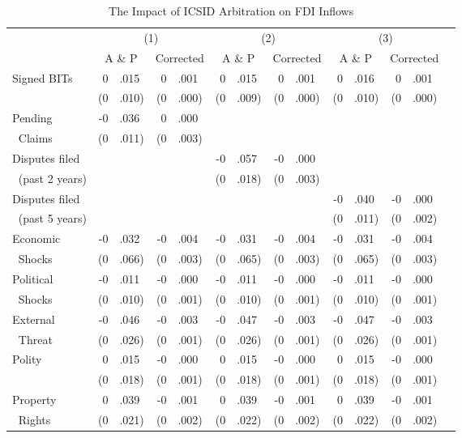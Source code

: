\documentclass[12pt,onesided]{amsart}
\begin{document}

\begin{table}[ht]
\vspace{1cm}
\centering
{\footnotesize
\caption{The Impact of ICSID Arbitration on FDI Inflows}
\label{tab:allee}
\begin{tabular}{lr@{} lr@{}lr@{}lr@{}lr@{}lr@{}lr@{} }
	\hline\hline
	~ & \multicolumn{4}{c}{(1)} & \multicolumn{4}{c}{(2)} & \multicolumn{4}{c}{(3)} \\	
	~ & \multicolumn{2}{c}{A \& P} & \multicolumn{2}{c}{Corrected} & \multicolumn{2}{c}{A \& P} & \multicolumn{2}{c}{Corrected} & \multicolumn{2}{c}{A \& P} & \multicolumn{2}{c}{Corrected}
	 \\ \hline
	\multirow{2}{*}{Signed BITs} & 0&.015 & 0&.001 & 0&.015 & 0&.001 & 0&.016 & 0&.001 \\
	~ & (0&.010) & (0&.000) & (0&.009) & (0&.000) & (0&.010) & (0&.000) \\
	Pending &-0&.036 &0&.000 && && && \\
	$\;\;$Claims &(0&.011) &(0&.003) && && && \\
	Disputes filed && && &-0&.057 &-0&.000 && && \\
	$\;\;$(past 2 years) && && &(0&.018) &(0&.003) && && \\
	Disputes filed && && && && &-0&.040 &-0&.000 \\
	$\;\;$(past 5 years) && && && && &(0&.011) &(0&.002) \\
	Economic & -0&.032 & -0&.004 & -0&.031 & -0&.004 & -0&.031 & -0&.004 \\
	$\;\;$Shocks & (0&.066) & (0&.003) & (0&.065) & (0&.003) & (0&.065) & (0&.003) \\
	Political & -0&.011 & -0&.000 & -0&.011 & -0&.000 & -0&.011 & -0&.000 \\
	$\;\;$Shocks & (0&.010) & (0&.001) & (0&.010) & (0&.001) & (0&.010) &(0&.001) \\
	External & -0&.046 & -0&.003 & -0&.047 & -0&.003 & -0&.047 & -0&.003 \\
	$\;\;$Threat & (0&.026) & (0&.001) & (0&.026) & (0&.001) & (0&.026) & (0&.001) \\
	\multirow{2}{*}{Polity} & 0&.015 & -0&.000 & 0&.015 & -0&.000 & 0&.015 & -0&.000 \\
	~ & (0&.018) & (0&.001) & (0&.018) & (0&.001) & (0&.018) &(0&.001) \\
	Property & 0&.039 & -0&.001 &  0&.039 & -0&.001 &  0&.039 & -0&.001 \\
	$\;\;$Rights & (0&.021) & (0&.002) & (0&.022) & (0&.002) & (0&.022) & (0&.002) \\

\end{tabular}}
\end{table}
\end{document}

